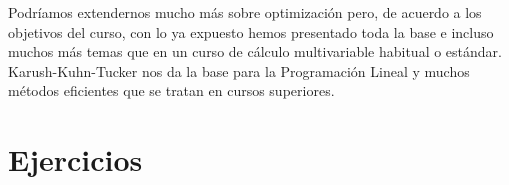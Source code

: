 
Podr\'iamos extendernos mucho m\'as sobre optimizaci\'on pero, de acuerdo a los objetivos del curso, con lo ya expuesto hemos presentado toda la base e incluso muchos m\'as temas que en un curso de c\'alculo multivariable habitual o est\'andar. Karush-Kuhn-Tucker nos da la base para la Programaci\'on Lineal y muchos m\'etodos eficientes que se tratan en cursos superiores.

 

\section{Ejercicios}



